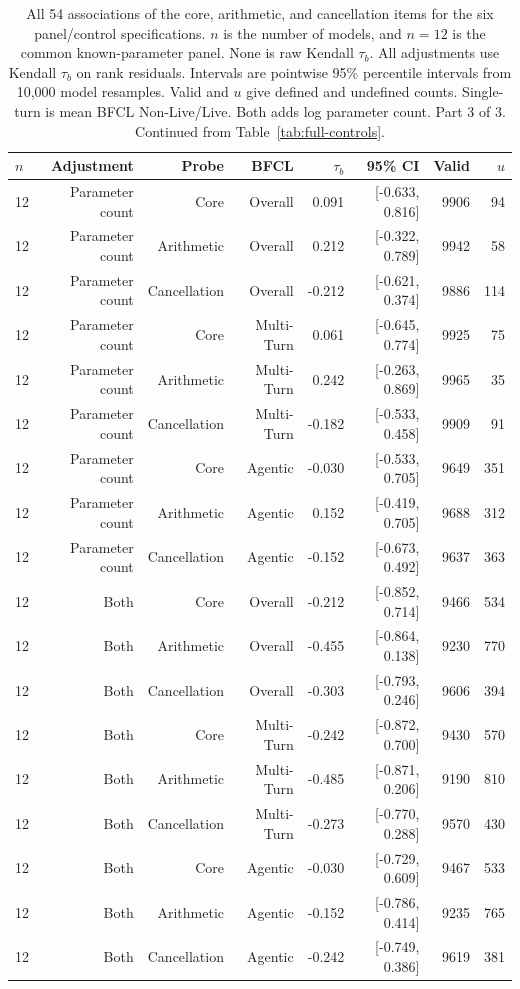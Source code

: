 \begin{table}[t]
\centering
\footnotesize
\setlength{\tabcolsep}{3pt}
\begin{tabular}{lrrrrrrr}
\toprule
$n$ & Adjustment & Probe & BFCL & $\tau_b$ & 95\% CI & Valid & $u$ \\
\midrule
12 & Parameter count & Core & Overall & 0.091 & [-0.633, 0.816] & 9906 & 94 \\
12 & Parameter count & Arithmetic & Overall & 0.212 & [-0.322, 0.789] & 9942 & 58 \\
12 & Parameter count & Cancellation & Overall & -0.212 & [-0.621, 0.374] & 9886 & 114 \\
12 & Parameter count & Core & Multi-Turn & 0.061 & [-0.645, 0.774] & 9925 & 75 \\
12 & Parameter count & Arithmetic & Multi-Turn & 0.242 & [-0.263, 0.869] & 9965 & 35 \\
12 & Parameter count & Cancellation & Multi-Turn & -0.182 & [-0.533, 0.458] & 9909 & 91 \\
12 & Parameter count & Core & Agentic & -0.030 & [-0.533, 0.705] & 9649 & 351 \\
12 & Parameter count & Arithmetic & Agentic & 0.152 & [-0.419, 0.705] & 9688 & 312 \\
12 & Parameter count & Cancellation & Agentic & -0.152 & [-0.673, 0.492] & 9637 & 363 \\
12 & Both & Core & Overall & -0.212 & [-0.852, 0.714] & 9466 & 534 \\
12 & Both & Arithmetic & Overall & -0.455 & [-0.864, 0.138] & 9230 & 770 \\
12 & Both & Cancellation & Overall & -0.303 & [-0.793, 0.246] & 9606 & 394 \\
12 & Both & Core & Multi-Turn & -0.242 & [-0.872, 0.700] & 9430 & 570 \\
12 & Both & Arithmetic & Multi-Turn & -0.485 & [-0.871, 0.206] & 9190 & 810 \\
12 & Both & Cancellation & Multi-Turn & -0.273 & [-0.770, 0.288] & 9570 & 430 \\
12 & Both & Core & Agentic & -0.030 & [-0.729, 0.609] & 9467 & 533 \\
12 & Both & Arithmetic & Agentic & -0.152 & [-0.786, 0.414] & 9235 & 765 \\
12 & Both & Cancellation & Agentic & -0.242 & [-0.749, 0.386] & 9619 & 381 \\
\bottomrule
\end{tabular}
\caption{All 54 associations of the core, arithmetic, and cancellation items for the six panel/control specifications. $n$ is the number of models, and $n=12$ is the common known-parameter panel. None is raw Kendall $\tau_b$. All adjustments use Kendall $\tau_b$ on rank residuals. Intervals are pointwise 95\% percentile intervals from 10,000 model resamples. Valid and $u$ give defined and undefined counts. Single-turn is mean BFCL Non-Live/Live. Both adds log parameter count. Part 3 of 3. Continued from Table~\ref{tab:full-controls}.}
\label{tab:full-controls:continued-3}
\end{table}
